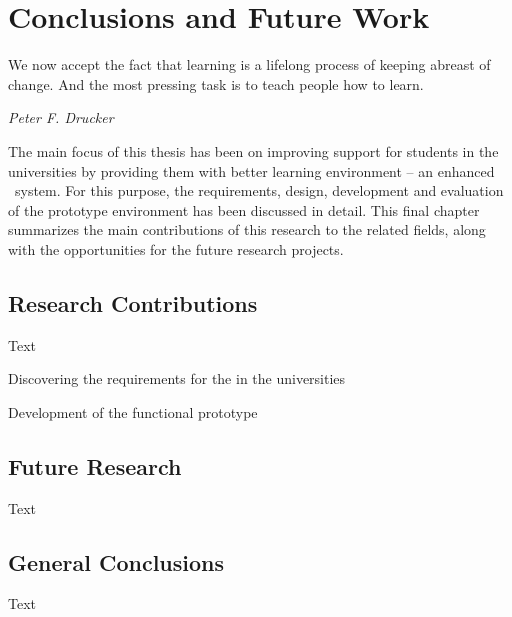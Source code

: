\chapter{Conclusions and Future Work\label{cha:conclusion}}
\epigraph{We now accept the fact that learning is a lifelong process of keeping
abreast of change. And the most pressing task is to teach people how to
learn.}{\textit{Peter F. Drucker}}

The main focus of this thesis has been on improving \LLLs support for students
in the universities by providing them with better learning environment -- an
enhanced \ep~system. For this purpose, the requirements, design, development and
evaluation of the prototype environment has been discussed in detail. This final
chapter summarizes the main contributions of this research to the related
fields, along with the opportunities for the future research projects.

\section{Research Contributions}

Text

Discovering the requirements for the \LLLs in the universities

Development of the functional prototype

\section{Future Research}

Text

\section{General Conclusions}

Text